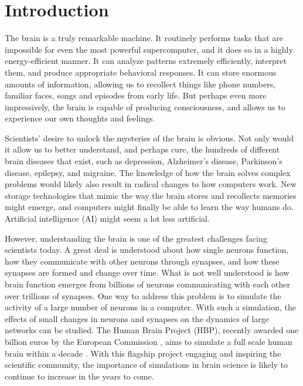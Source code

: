 \chapter{Introduction\label{ch:intro}}

\graphicspath{{figs/introduction/}}

The brain is a truly remarkable machine. It routinely performs tasks that are impossible for even the most powerful supercomputer, and it does so in a highly energy-efficient manner. It can analyze patterns extremely efficiently, interpret them, and produce appropriate behavioral responses. It can store enormous amounts of information, allowing us to recollect things like phone numbers, familiar faces, songs and episodes from early life. But perhaps even more impressively, the brain is capable of producing consciousness, and allows us to experience our own thoughts and feelings. 

Scientists' desire to unlock the mysteries of the brain is obvious. Not only would it allow us to better understand, and perhaps cure, the hundreds of different brain diseases that exist, such as depression, Alzheimer's disease, Parkinson's disease, epilepsy, and migraine. The knowledge of how the brain solves complex problems would likely also result in radical changes to how computers work. New storage technologies that mimic the way the brain stores and recollects memories might emerge, and computers might finally be able to learn the way humans do. Artificial intelligence (AI) might seem a lot less artificial. 

However, understanding the brain is one of the greatest challenges facing scientists today. A great deal is understood about how single neurons function, how they communicate with other neurons through synapses, and how these synapses are formed and change over time. What is not well understood is how brain function emerges from billions of neurons communicating with each other over trillions of synapses. One way to address this problem is to simulate the activity of a large number of neurons in a computer. With such a simulation, the effects of small changes in neurons and synapses on the dynamics of large networks can be studied. The Human Brain Project (HBP), recently awarded one billion euros by the European Commission \cite{abbott2013brain}, aims to simulate a full scale human brain within a decade \cite{hbp2012}. With this flagship project engaging and inspiring the scientific community, the importance of simulations in brain science is likely to continue to increase in the years to come. 

